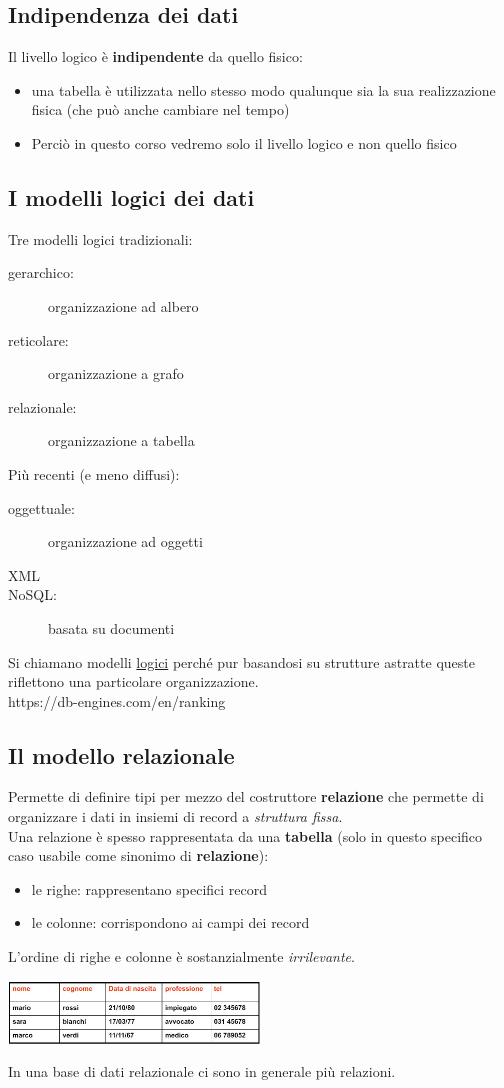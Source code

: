 \subsection{Indipendenza dei dati}
Il livello logico è \textbf{indipendente} da quello fisico:
\begin{itemize}
    \item una tabella è utilizzata nello stesso modo qualunque sia la sua realizzazione fisica (che può anche cambiare nel tempo)
    \item Perciò in questo corso vedremo solo il livello logico e non quello fisico
\end{itemize}

\subsection{I modelli logici dei dati}
Tre modelli logici tradizionali:
\begin{description}
    \item[gerarchico:] organizzazione ad albero
    \item[reticolare:] organizzazione a grafo
    \item[relazionale:] organizzazione a tabella
\end{description}
Più recenti (e meno diffusi):
\begin{description}
    \item[oggettuale:] organizzazione ad oggetti
    \item[XML] 
    \item[NoSQL:] basata su documenti
\end{description}
Si chiamano modelli \underline{logici} perché pur basandosi su strutture astratte queste riflettono una particolare organizzazione.
\\https://db-engines.com/en/ranking


\subsection{Il modello relazionale}
Permette di definire tipi per mezzo del costruttore \textbf{relazione} che permette di organizzare i dati in insiemi di record a \textit{struttura fissa}.
\\Una relazione è spesso rappresentata da una \textbf{tabella} (solo in questo specifico caso usabile come sinonimo di \textbf{relazione}):
\begin{itemize}
    \item le righe: rappresentano specifici record
    \item le colonne: corrispondono ai campi dei record
\end{itemize}
L'ordine di righe e colonne è sostanzialmente \textit{irrilevante}.
\begin{center}
    \includegraphics[width=0.5\textwidth]{chaptersLezioniSara/img/MR_intro1.jpg}
\end{center}
In una base di dati relazionale ci sono in generale più relazioni.

